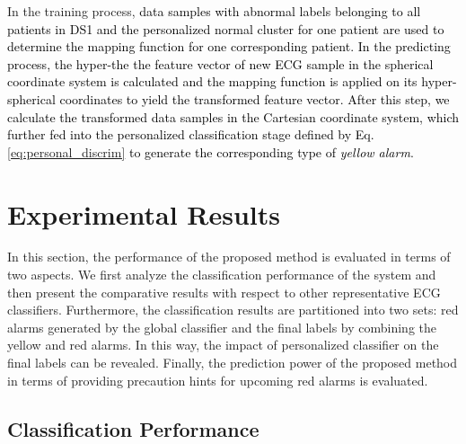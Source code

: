 In the training process, \textcolor{black}{data samples with abnormal labels belonging to all patients in DS1 and the personalized normal cluster for one patient are used to determine the mapping function for one corresponding patient. In the predicting process, the hyper-the the feature vector of new ECG sample in the spherical coordinate system is calculated and the mapping function is applied on its hyper-spherical coordinates to yield the transformed feature vector. After this step, we calculate the transformed data samples in the Cartesian coordinate system, which further fed into the personalized classification stage defined by Eq. \ref{eq:personal_discrim} to generate the corresponding type of \textit{yellow alarm}.} %



\section{Experimental Results}\label{sec:result_spatial}

In this section, the performance of the proposed method is evaluated in terms of two aspects. We first analyze the classification performance of the system and then present the comparative results with respect to other representative ECG classifiers. Furthermore, the classification results are partitioned into two sets:  red alarms generated by the global classifier and the final labels by combining the yellow and red alarms. In this way, the impact of personalized classifier on the final labels can be revealed. Finally, the prediction power of the proposed method in terms of providing precaution hints for upcoming red alarms is evaluated.

\subsection{Classification Performance}

